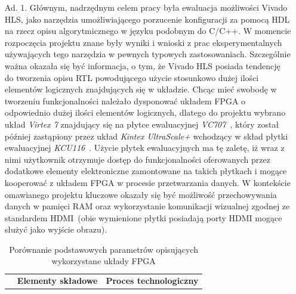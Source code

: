 \begin{enumerate}
\item[Ad. 1.] Głównym, nadrzędnym celem pracy była ewaluacja możliwości Vivado HLS, jako narzędzia umożliwiającego porzucenie konfiguracji za pomocą HDL na rzecz opisu algorytmicznego w języku podobnym do C/C++. W momencie rozpoczęcia projektu znane były wyniki i wnioski z prac eksperymentalnych używających tego narzędzia w pewnych typowych zastosowaniach. Szczególnie ważna okazała się być informacja, o tym, że Vivado HLS posiada tendencję do tworzenia opisu RTL powodującego użycie stosunkowo dużej ilości elementów logicznych znajdujących się w układzie. Chcąc mieć swobodę w tworzeniu funkcjonalności należało dysponować układem FPGA o odpowiednio dużej ilości elementów logicznych, dlatego do projektu wybrano układ \textit{Virtex 7} znajdujący się na płytce ewaluacyjnej \textit{VC707}~\cite{VC707_UG}, który został później zastąpiony przez układ \textit{Kintex UltraScale+} wchodzący w skład płytki ewaluacyjnej \textit{KCU116}~\cite{KCU116_UG}. 
Użycie płytek ewaluacyjnych ma tę zaletę, iż wraz z nimi użytkownik otrzymuje dostęp do funkcjonalności oferowanych przez dodatkowe elementy elektroniczne zamontowane na takich płytkach i mogące kooperować z układem FPGA w procesie przetwarzania danych. W kontekście omawianego projektu kluczowe okazały się być możliwość przechowywania danych w pamięci RAM oraz wykorzystanie komunikacji wizualnej zgodnej ze standardem HDMI~(obie wymienione płytki posiadają porty HDMI mogące służyć jako wyjście obrazu).
\begin{savenotes}
\begin{table}[H]
\centering
\caption{Porównanie podstawowych parametrów opisujących wykorzystane układy FPGA}
\label{ch3:tab:fpga_comp}
\begin{tabular}{|r|c|c|c|c|c|}
\hline
\multirow{2}{*}{} & \multicolumn{4}{c|}{\textbf{Elementy składowe}} & \multirow{2}{*}{\textbf{Proces technologiczny}} \\ \cline{2-5}

\end{tabular}
\end{table}
\end{savenotes}
\end{enumerate}
